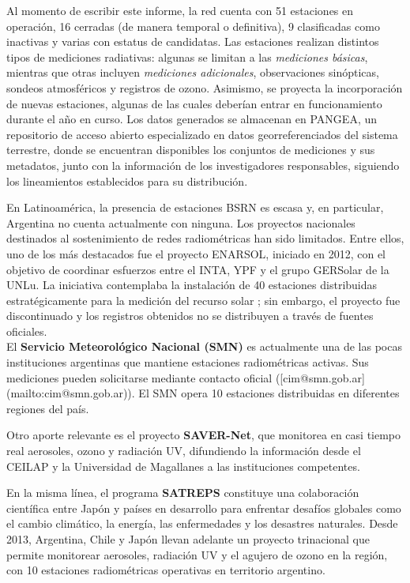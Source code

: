 Al momento de escribir este informe, la red cuenta con 51 estaciones en operación, 16 cerradas (de manera temporal o definitiva), 9 clasificadas como inactivas y varias con estatus de candidatas. Las estaciones realizan distintos tipos de mediciones radiativas: algunas se limitan a las \textit{mediciones básicas}, mientras que otras incluyen \textit{mediciones adicionales}, observaciones sinópticas, sondeos atmosféricos y registros de ozono. Asimismo, se proyecta la incorporación de nuevas estaciones, algunas de las cuales deberían entrar en funcionamiento durante el año en curso. Los datos generados se almacenan en PANGEA, un repositorio de acceso abierto especializado en datos georreferenciados del sistema terrestre, donde se encuentran disponibles los conjuntos de mediciones y sus metadatos, junto con la información de los investigadores responsables, siguiendo los lineamientos establecidos para su distribución.

En Latinoamérica, la presencia de estaciones BSRN es escasa y, en particular, Argentina no cuenta actualmente con ninguna. Los proyectos nacionales destinados al sostenimiento de redes radiométricas han sido limitados. Entre ellos, uno de los más destacados fue el proyecto ENARSOL, iniciado en 2012, con el objetivo de coordinar esfuerzos entre el INTA, YPF y el grupo GERSolar de la UNLu. La iniciativa contemplaba la instalación de 40 estaciones distribuidas estratégicamente para la medición del recurso solar \citep{aristegui2012}; sin embargo, el proyecto fue discontinuado y los registros obtenidos no se distribuyen a través de fuentes oficiales.\\

El \textbf{Servicio Meteorológico Nacional (SMN)} es actualmente una de las pocas instituciones argentinas que mantiene estaciones radiométricas activas. Sus mediciones pueden solicitarse mediante contacto oficial ([cim@smn.gob.ar](mailto:cim@smn.gob.ar)). El SMN opera 10 estaciones distribuidas en diferentes regiones del país.

Otro aporte relevante es el proyecto \textbf{SAVER-Net}, que monitorea en casi tiempo real aerosoles, ozono y radiación UV, difundiendo la información desde el CEILAP y la Universidad de Magallanes a las instituciones competentes.

En la misma línea, el programa \textbf{SATREPS} constituye una colaboración científica entre Japón y países en desarrollo para enfrentar desafíos globales como el cambio climático, la energía, las enfermedades y los desastres naturales. Desde 2013, Argentina, Chile y Japón llevan adelante un proyecto trinacional que permite monitorear aerosoles, radiación UV y el agujero de ozono en la región, con 10 estaciones radiométricas operativas en territorio argentino.\\

